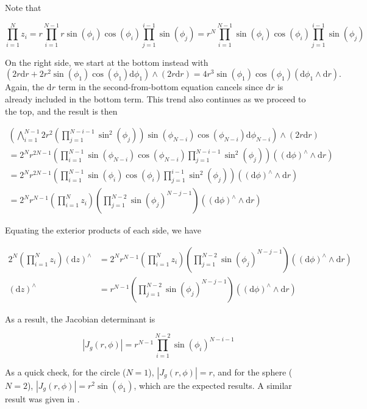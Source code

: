 \documentclass[11pt]{article}
\newcommand{\abs}[1]{\left| #1 \right|}
\newcommand{\absdet}[1]{\abs{#1}}
\newcommand{\dv}[1]{\mathrm{d}{#1}}
\begin{document}
Note that

\[
  \prod_{i=1}^N z_i = r \prod_{i=1}^{N-1} r \sin(\phi_i) \cos(\phi_i) \prod_{j=1}^{i-1} \sin(\phi_j) = r^N \prod_{i=1}^{N-1} \sin(\phi_i) \cos(\phi_i) \prod_{j=1}^{i-1} \sin(\phi_j)
\]

On the right side, we start at the bottom instead with
\[
(2r\dv{r} + 2 r^2 \sin(\phi_1) \cos(\phi_1) \dv{\phi_1}) \wedge (2r\dv{r}) = 4 r^3 \sin(\phi_1) \cos(\phi_1) (\dv{\phi_1} \wedge \dv{r}).
\]
Again, the $\dv{r}$ term in the second-from-bottom equation cancels since $\dv{r}$ is already included in the bottom term.
This trend also continues as we proceed to the top, and the result is then

\[
\begin{aligned}
    \left(\bigwedge_{i=1}^{N - 1} 2 r^2 \left(\prod_{j=1}^{N - i - 1} \sin^2(\phi_j)\right) \sin(\phi_{N-i}) \cos(\phi_{N-i}) \dv{\phi_{N-i}} \right) \wedge (2r\dv{r}) \\
    = 2^N r^{2N-1} \left(\prod_{i=1}^{N-1} \sin(\phi_{N-i}) \cos(\phi_{N-i}) \prod_{j=1}^{N-i-1} \sin^2(\phi_j)\right) \left((\dv{\phi})^\wedge \wedge \dv{r}\right)\\
    = 2^N r^{2N-1} \left(\prod_{i=1}^{N-1} \sin(\phi_i) \cos(\phi_i) \prod_{j=1}^{i-1} \sin^2(\phi_j)\right) \left((\dv{\phi})^\wedge \wedge \dv{r}\right)\\
    = 2^N r^{N-1} \left(\prod_{i=1}^N z_i\right) \left(\prod_{j=1}^{N-2} \sin(\phi_j)^{N-j-1}\right) \left((\dv{\phi})^\wedge \wedge \dv{r}\right)
\end{aligned}
\]

Equating the exterior products of each side, we have 

\[
\begin{aligned}
    2^N \left(\prod_{i=1}^N z_i \right) (\dv{z})^\wedge &= 2^N r^{N-1} \left(\prod_{i=1}^N z_i\right) \left(\prod_{j=1}^{N-2} \sin(\phi_j)^{N-j-1}\right) \left((\dv{\phi})^\wedge \wedge \dv{r}\right)\\
    (\dv{z})^\wedge &= r^{N-1} \left(\prod_{j=1}^{N-2} \sin(\phi_j)^{N-j-1}\right) \left((\dv{\phi})^\wedge \wedge \dv{r}\right)
\end{aligned}
\]

As a result, the Jacobian determinant is

\[
    \absdet{J_g(r, \phi)} = r^{N-1} \prod_{i=1}^{N-2} \sin(\phi_i)^{N-i-1}
\]

As a quick check, for the circle ($N=1$), $\absdet{J_g(r, \phi)} = r$, and for the sphere ($N=2$), $\absdet{J_g(r, \phi)} = r^2 \sin(\phi_1)$, which are the expected results.
A similar result was given in \cite{muirhead2009aspects}.
\end{document}
